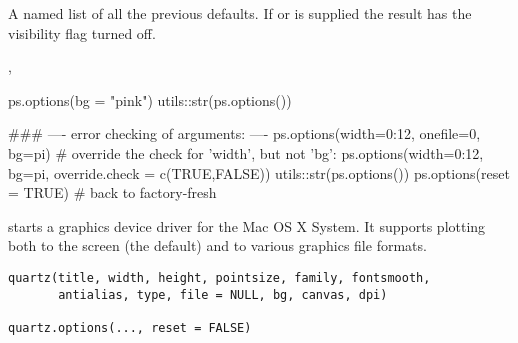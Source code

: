%
\begin{Value}
A named list of all the previous defaults.  If  or
 is supplied the result has the visibility flag
turned off.
\end{Value}
%
\begin{SeeAlso}\relax
{}, 
\end{SeeAlso}
%
\begin{Examples}
\begin{ExampleCode}
ps.options(bg = "pink")
utils::str(ps.options())

### ---- error checking of arguments: ----
ps.options(width=0:12, onefile=0, bg=pi)
# override the check for 'width', but not 'bg':
ps.options(width=0:12, bg=pi, override.check = c(TRUE,FALSE))
utils::str(ps.options())
ps.options(reset = TRUE) # back to factory-fresh
\end{ExampleCode}
\end{Examples}
%
\begin{Description}\relax
{} starts a graphics device driver for the Mac OS X System.
It supports plotting both to the screen (the default) and to various
graphics file formats.
\end{Description}
%
\begin{Usage}
\begin{verbatim}
quartz(title, width, height, pointsize, family, fontsmooth,
       antialias, type, file = NULL, bg, canvas, dpi)

quartz.options(..., reset = FALSE)
\end{verbatim}
\end{Usage}
%
